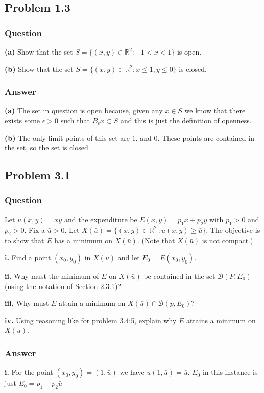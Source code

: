 \documentclass[12pt]{article}
\begin{document}
\subsection{Problem 1.3}
\subsubsection{Question}
\textbf{(a)} Show that the set $S = \{ (x,y) \in \mathbb{R}^2 : -1<x<1\}$ is open.

\textbf{(b)} Show that the set $S=\{ (x,y) \in \mathbb{R}^2 : x \leq 1, y\leq 0 \}$ is closed.
\subsubsection{Answer}
\textbf{(a)} The set in question is open because, given any $x \in S$ we know that there exists some $\epsilon>0$ such that $B_\epsilon x \subset S$ and this is just the definition of openness.

\textbf{(b)} The only limit points of this set are $1$, and $0$. These points are contained in the set, so the set is closed.

\subsection{Problem 3.1}
\subsubsection{Question}
Let $u(x,y) = x y$ and the expenditure be $E(x,y)= p_1 x +p_2 y$ with $p_1>0$ and $p_2>0$. Fix a $\bar{u}>0$. Let $X(\bar{u}) = \{ (x,y) \in \mathbb{R}_+^2 : u(x,y) \geq\bar{u} \}$. The objective is to show that $E$ has a minimum on $X(\bar{u})$. (Note that $X(\bar{u})$ is not compact.)

\textbf{i.} Find a point $(x_0,y_0)$ in $X(\bar{u})$ and let $E_0 = E(x_0,y_0)$.

\textbf{ii.} Why must the minimum of $E$ on $X(\bar{u})$ be contained in the set $\mathcal{B}(P,E_0)$ (using the notation of Section 2.3.1)?

\textbf{iii.} Why must $E$ attain a minimum on $X(\bar{u}) \cap \mathcal{B}(p,E_0)$?

\textbf{iv.} Using reasoning like for problem 3.4:5, explain why $E$ attains a minimum on $X(\bar{u})$.



\subsubsection{Answer}
\textbf{i.}  For the point $(x_0,y_0) = (1,\bar{u})$ we have $u(1,\bar{u})=\bar{u}$. $E_0$ in this instance is just $E_0=p_1+p_2 \bar{u}$
\end{document}
